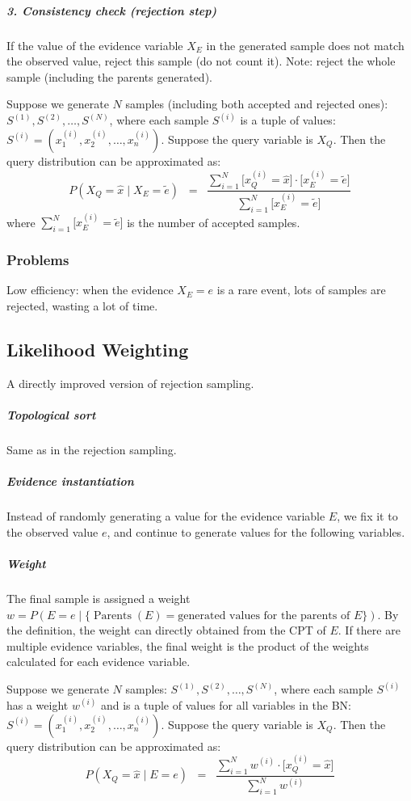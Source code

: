 \documentclass[10pt,UTF8]{article}
\theoremstyle{definition}
\newtheorem{definition inner}{Definition}[section]
\theoremstyle{definition}
\newtheorem{theorem inner}{Theorem}[section]
\theoremstyle{definition}
\newtheorem*{proof inner}{\textit{Proof}}
\theoremstyle{plain}
\newtheorem{tip inner}{Tip}[section]
\theoremstyle{remark}
\DeclareMathOperator{\Pa}{Parents} %
\begin{document}
\subparagraph*{3. Consistency check (rejection step)}
If the value of the evidence variable \(X_E\) in the generated sample
does not match the observed value, reject this sample (do not count it).
Note: reject the whole sample (including the parents generated).

\bigskip

Suppose we generate \(N\) samples (including both accepted and rejected ones):
\(S^{(1)}, S^{(2)}, \ldots, S^{(N)}\),
where each sample \(S^{(i)}\) is a tuple of values\@:
\(S^{(i)} = (x_{1}^{(i)}, x_{2}^{(i)}, \ldots, x_{n}^{(i)})\).
Suppose the query variable is \(X_Q\).
Then the query distribution can be approximated as:
\[
  P(X_Q = \hat{x} \mid X_E=\tilde{e}) \; \; = \; \;
  \frac{\displaystyle\sum_{i=1}^N \big[{x_Q^{(i)} = \hat{x}} \big]
  \cdot \big[{x_E^{(i)} = \tilde{e}} \big]}
  {\displaystyle\sum_{i=1}^N \big[{x_E^{(i)} = \tilde{e}} \big]}
\]
where \(\displaystyle\sum_{i=1}^N \big[{x_E^{(i)} = \tilde{e}} \big]\)
is the number of accepted samples.

\subsubsection{Problems}

Low efficiency:
when the evidence \(X_E=e\) is a rare event,
lots of samples are rejected, wasting a lot of time.

\subsection{Likelihood Weighting}

A directly improved version of rejection sampling.

\subparagraph*{Topological sort}
Same as in the rejection sampling.

\subparagraph*{Evidence instantiation}
Instead of randomly generating a value for the evidence variable \(E\),
we fix it to the observed value \(e\),
and continue to generate values for the following variables.

\subparagraph*{Weight}
The final sample is assigned a weight
\(w = P(E=e \mid \big \{
      \Pa(E) = \text{generated values for the parents of } E \big
\}) \).
By the definition, the weight can directly obtained from the CPT of \(E\).
If there are multiple evidence variables,
the final weight is the product of the weights calculated for each
evidence variable.

\bigskip

Suppose we generate \(N\) samples:
\(S^{(1)}, S^{(2)}, \ldots, S^{(N)}\),
where each sample \(S^{(i)}\) has a weight \(w^{(i)}\) and is a tuple of
values for all variables in the BN\@:
\(S^{(i)} = (x_{1}^{(i)}, x_{2}^{(i)}, \ldots, x_{n}^{(i)})\).
Suppose the query variable is \(X_Q\).
Then the query distribution can be approximated as:
\[
  P(X_Q = \hat{x} \mid E=e) \; \; = \; \;
  \frac{\displaystyle\sum_{i=1}^N w^{(i)} \cdot
  \big[{x_Q^{(i)} = \hat{x}} \big]}
  {\displaystyle\sum_{i=1}^N w^{(i)}}
\]
\end{document}
